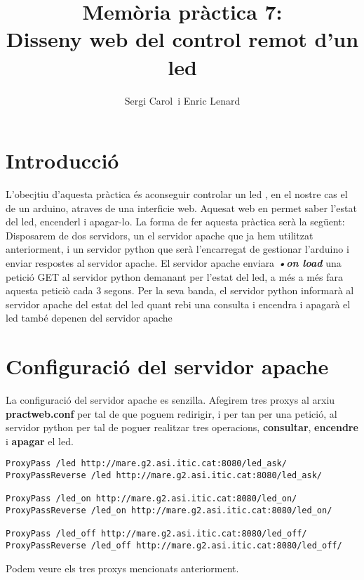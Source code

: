 \documentclass[11p]{article}
\title{\huge\textbf{ Memòria pràctica 7:\\ Disseny web del control remot d'un led}}
\author{Sergi Carol\ i Enric Lenard }
\begin{document}
\maketitle

\section*{Introducció}

L'obecjtiu d'aquesta pràctica és aconseguir controlar un led , en el nostre cas el de un arduino, atraves de una interficie web. Aquesat web en permet saber l'estat del led, encenderl i apagar-lo. La forma de fer aquesta pràctica serà la següent: 
\newline
Disposarem de dos servidors, un el servidor apache que ja hem utilitzat anteriorment, i un servidor python que serà l'encarregat de gestionar l'arduino i enviar respostes al servidor apache. El servidor apache enviara \textbf{\textit{•on load}} una petició GET al servidor python demanant per l'estat del led, a més a més fara aquesta peticiò cada 3 segons. Per la seva banda, el servidor python informarà al servidor apache del estat del led quant rebi una consulta i encendra i apagarà el led també depenen del servidor apache


\section{Configuració del servidor apache}

La configuració del servidor apache es senzilla. Afegirem tres proxys al arxiu \textbf{practweb.conf} per tal de que poguem redirigir, i per tan per una petició, al servidor python per tal de poguer realitzar tres operacions, \textbf{consultar}, \textbf{encendre} i \textbf{apagar} el led.
\newline
\begin{lstlisting}
ProxyPass /led http://mare.g2.asi.itic.cat:8080/led_ask/
ProxyPassReverse /led http://mare.g2.asi.itic.cat:8080/led_ask/

ProxyPass /led_on http://mare.g2.asi.itic.cat:8080/led_on/
ProxyPassReverse /led_on http://mare.g2.asi.itic.cat:8080/led_on/

ProxyPass /led_off http://mare.g2.asi.itic.cat:8080/led_off/
ProxyPassReverse /led_off http://mare.g2.asi.itic.cat:8080/led_off/
\end{lstlisting}

Podem veure els tres proxys mencionats anteriorment.
\newline
\end{document}

